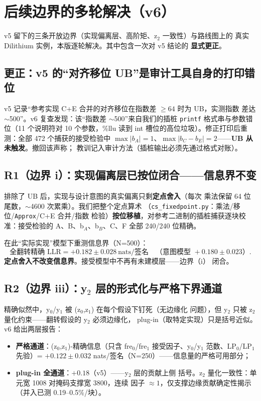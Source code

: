 \documentclass[11pt,a4paper]{ctexart}
\begin{document}
\section{后续边界的多轮解决（v6）}

v5 留下的三条开放边界（实现偏离层、高阶矩、z$_2$ 一致性）与路线图上的
真实 Dilithium 实例，本版逐轮解决。其中包含一次对 v5 结论的
\textbf{显式更正}。

\subsection{更正：v5 的``对齐移位 UB''是审计工具自身的打印错位}

v5 记录``参考实现 C+E 合并的对齐移位在指数差 $\ge64$ 时为 UB，实测指数
差达 $\sim$500''。v6 复查发现：该``指数差 $\sim$500''来自我们的插桩
\texttt{printf} 格式串与参数错位（11 个说明符对 10 个参数，\%llu 读到
int 槽位的高位垃圾）。修正打印后重测：全部 472 个捕获的接受检验中
$\max|b_A|=1$、$\max|b_C-b_E|=2$——\textbf{UB 从未触发}。撤回该声称；
教训记入审计方法（插桩输出必须先通过格式对账）。

\subsection{R1（边界 i）：实现偏离层已按位闭合——信息界不变}

排除了 UB 后，实现与设计意图的真实偏离只剩\textbf{定点舍入}（每次
乘法保留 64 位尾数，$\sim$4600 次累乘）。我们把整个定点算术
（\texttt{cs\_fixedpoint.py}：乘法/移位/\texttt{Approx}/C+E 合并/指数
检验）\textbf{按位移植}，对参考二进制的插桩捕获逐块校准：接受检验的
A、B、b$_A$、b$_B$、C、F 全部 240/240 位精确。

在此``实际实现''模型下重测信息界（N=500）：
\[
\text{全翻转精确 LLR} = +0.182\pm0.028 \ \text{nats/签名}
\quad\text{（意图模型 } +0.180\pm0.023\text{）}.
\]
\textbf{定点舍入不改变信息界}。接受模型中不再有未建模层——边界（i）
闭合。

\subsection{R2（边界 iii）：y$_2$ 层的形式化与严格下界通道}

精确似然中，y$_0$/y$_1$ 被 (z$_0$,z$_1$) 在每个假设下钉死（无边缘化
问题），但 y$_2$ 只被 z$_2$ 量化约束——翻转假设的 y$_2$ 必须边缘化，
plug-in（取特定实现）只是括号近似。v6 给出两层报告：

\begin{itemize}
  \item \textbf{严格通道}：(z$_0$,z$_1$)-精确信息（只含 fre$_0$/fre$_1$
        接受因子、y$_0$/y$_1$ 范数、LP$_0$/LP$_1$ 先验）=
        $+0.122\pm0.032$ nats/签名（N=250）——信息量的严格可用部分；
  \item \textbf{plug-in 全通道}：$+0.18$（v5）——y$_2$ 层的贡献上侧
        括号。z$_2$ 量化一致性：单元宽 1008 对掩码支撑宽 3800，连续
        因子 $\approx1$，仅支撑边缘贡献确定性揭示（并入已测
        0.19--0.5\%/块）。
\end{itemize}
\end{document}
